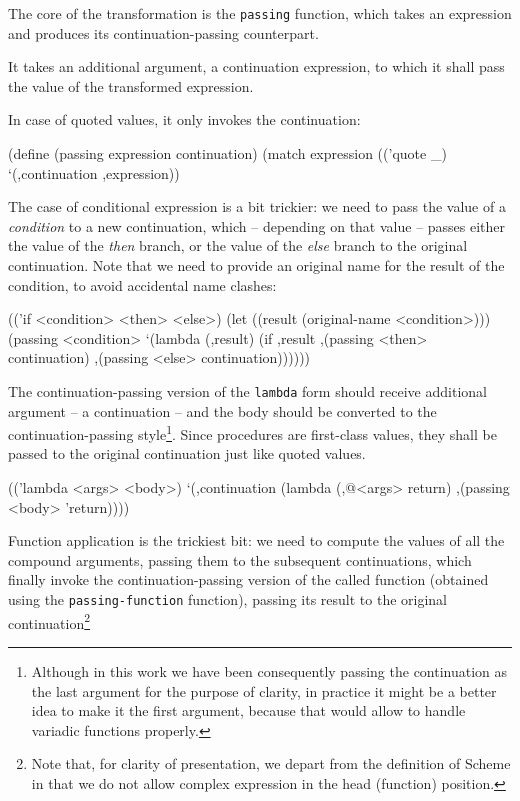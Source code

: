 The core of the transformation is the \texttt{passing} function,
which takes an expression and produces its continuation-passing
counterpart.

It takes an additional argument, a continuation expression, to
which it shall pass the value of the transformed expression.

In case of quoted values, it only invokes the continuation:

\begin{Snippet}
(define (passing expression continuation)
  (match expression
    (('quote _)
     `(,continuation ,expression))
\end{Snippet}

The case of conditional expression is a bit trickier:
we need to pass the value of a \textit{condition} to a new continuation,
which -- depending on that value -- passes either the value
of the \textit{then} branch, or the value of the \textit{else}
branch to the original continuation. Note that we need to
provide an original name for the result of the condition, to avoid
accidental name clashes:

\begin{Snippet}
    (('if <condition> <then> <else>)
     (let ((result (original-name <condition>)))
       (passing <condition>
         `(lambda (,result)
	    (if ,result
	        ,(passing <then> continuation)
	        ,(passing <else> continuation))))))
\end{Snippet}

The continuation-passing version of the \texttt{lambda} form should receive
additional argument -- a continuation -- and the body should be converted
to the continuation-passing style\footnote{Although in this work we have
  been consequently passing the continuation as the last argument for the
  purpose of clarity, in practice it might be a better idea to make it
  the first argument, because that would allow to handle variadic functions
  properly.}. Since procedures are first-class values,
they shall be passed to the original continuation just like quoted values.

\begin{Snippet}
    (('lambda <args> <body>)
     `(,continuation (lambda (,@<args> return)
                       ,(passing <body> 'return))))
\end{Snippet}

Function application is the trickiest bit: we need to compute the
values of all the compound arguments, passing them to the subsequent
continuations, which finally invoke the continuation-passing version
of the called function (obtained using the \texttt{passing-function}
function), passing its result to the original continuation\footnote{Note
  that, for clarity of presentation, we depart from the definition
  of Scheme in that we do not allow complex expression in the head
  (function) position.}

